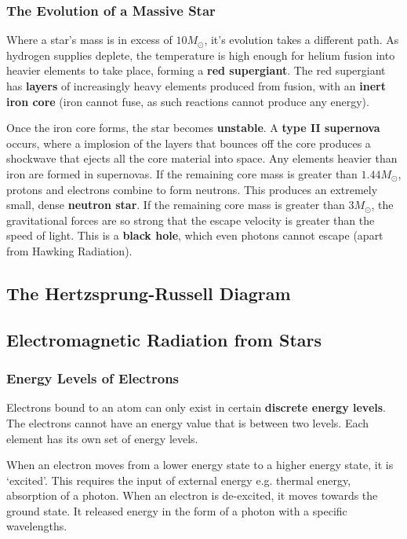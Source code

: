 \subsubsection*{The Evolution of a Massive Star}

Where a star's mass is in excess of $10 M_{\odot}$, it's evolution takes a different path. As hydrogen supplies deplete, the temperature is high enough for helium fusion into heavier elements to take place, forming a \textbf{red supergiant}. The red supergiant has \textbf{layers} of increasingly heavy elements produced from fusion, with an \textbf{inert iron core} (iron cannot fuse, as such reactions cannot produce any energy).

Once the iron core forms, the star becomes \textbf{unstable}. A \textbf{type II supernova} occurs, where a implosion of the layers that bounces off the core produces a shockwave that ejects all the core material into space. Any elements heavier than iron are formed in supernovas. If the remaining core mass is greater than $1.44 M_{\odot}$, protons and electrons combine to form neutrons. This produces an extremely small, dense \textbf{neutron star}. If the remaining core mass is greater than $3 M_{\odot}$, the gravitational forces are so strong that the escape velocity is greater than the speed of light. This is a \textbf{black hole}, which even photons cannot escape (apart from Hawking Radiation).

\subsection{The Hertzsprung-Russell Diagram}

\subsection{Electromagnetic Radiation from Stars}

\subsubsection*{Energy Levels of Electrons}

Electrons bound to an atom can only exist in certain \textbf{discrete energy levels}. The electrons cannot have an energy value that is between two levels. Each element has its own set of energy levels.

When an electron moves from a lower energy state to a higher energy state, it is `excited'. This requires the input of external energy e.g. thermal energy, absorption of a photon. When an electron is de-excited, it moves towards the ground state. It released energy in the form of a photon with a specific wavelengths. 


